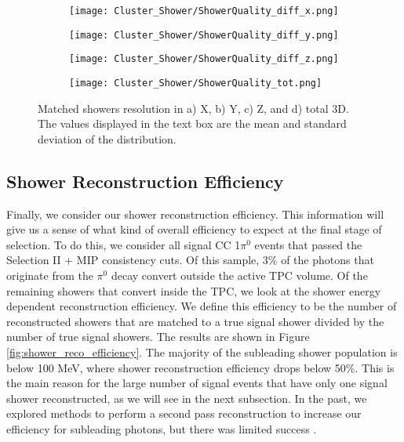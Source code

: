 \documentclass{article}
\begin{document}
\begin{figure}[h!]
\centering
  \begin{subfigure}[t]{0.45\textwidth}
    \centering
\texttt{[image: Cluster\_Shower/ShowerQuality\_diff\_x.png]}
  \caption{ }
  \end{subfigure} 
  \hspace{5mm}
  \begin{subfigure}[t]{0.45\textwidth}
    \centering
\texttt{[image: Cluster\_Shower/ShowerQuality\_diff\_y.png]}
  \caption{ }
  \end{subfigure} 
  \hspace{5mm}
  \begin{subfigure}[t]{0.45\textwidth}
    \centering
\texttt{[image: Cluster\_Shower/ShowerQuality\_diff\_z.png]}
  \caption{ }
  \end{subfigure} 
  \hspace{5mm}
  \begin{subfigure}[t]{0.45\textwidth}
    \centering
\texttt{[image: Cluster\_Shower/ShowerQuality\_tot.png]}
  \caption{ }
  \end{subfigure} 
\caption{ Matched showers resolution in a) X, b) Y, c) Z, and d) total 3D. The values displayed in the text box are the mean and standard deviation of the distribution. }
\label{fig:showerquality_xyzres}
\end{figure}

\clearpage
\subsection{Shower Reconstruction Efficiency}
Finally, we consider our shower reconstruction efficiency. This information will give us a sense of what kind of overall efficiency to expect at the final stage of selection. To do this, we consider all signal CC 1$\pi^0$ events that passed the Selection II + MIP consistency cuts. Of this sample, 3\% of the photons that originate from the $\pi^0$ decay convert outside the active TPC volume. Of the remaining showers that convert inside the TPC, we look at the shower energy dependent reconstruction efficiency. We define this efficiency to be the number of reconstructed showers that are matched to a true signal shower divided by the number of true signal showers. The results are shown in Figure \ref{fig:shower_reco_efficiency}.  The majority of the subleading shower population is below 100 MeV, where shower reconstruction efficiency drops below 50\%.  This is the main reason for the large number of signal events that have only one signal shower reconstructed, as we will see in the next subsection. In the past, we explored methods to perform a second pass reconstruction to increase our efficiency for subleading photons, but there was limited success \cite{bib:jz_catch_subleading}.  
\end{document}
